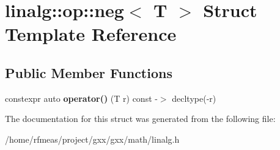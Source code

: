 \hypertarget{structlinalg_1_1op_1_1neg}{}\section{linalg\+:\+:op\+:\+:neg$<$ T $>$ Struct Template Reference}
\label{structlinalg_1_1op_1_1neg}
\subsection*{Public Member Functions}
\begin{DoxyCompactItemize}
\item 
constexpr auto {\bfseries operator()} (T r) const -\/$>$ decltype(-\/r)\hypertarget{structlinalg_1_1op_1_1neg_a942ee0d1d37560e43a4591544f446d6e}{}\label{structlinalg_1_1op_1_1neg_a942ee0d1d37560e43a4591544f446d6e}

\end{DoxyCompactItemize}


The documentation for this struct was generated from the following file\+:\begin{DoxyCompactItemize}
\item 
/home/rfmeas/project/gxx/gxx/math/linalg.\+h\end{DoxyCompactItemize}
